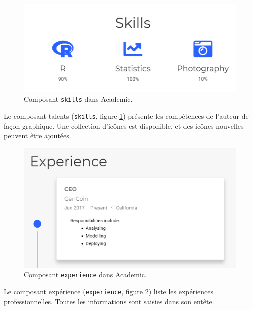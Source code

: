\documentclass[
  11pt,
  french,
  a4paper,
  extrafontsizes,onecolumn,openright
  ]{memoir}
\begin{document}
\scriptsize

\begin{figure}

{\centering \includegraphics[width=0.8\linewidth]{images/rediger-skills} 

}

\caption{Composant \texttt{skills} dans Academic.}\label{fig:rediger-skills}
\end{figure}

\normalsize

Le composant talents (\texttt{skills}, figure \ref{fig:rediger-skills}) présente les compétences de l'auteur de façon graphique.
Une collection d'icônes est disponible, et des icônes nouvelles peuvent être ajoutées.



\scriptsize

\begin{figure}

{\centering \includegraphics[width=0.8\linewidth]{images/rediger-experience} 

}

\caption{Composant \texttt{experience} dans Academic.}\label{fig:rediger-experience}
\end{figure}

\normalsize

Le composant expérience (\texttt{experience}, figure \ref{fig:rediger-experience}) liste les expériences professionnelles.
Toutes les informations sont saisies dans son entête.
\end{document}

